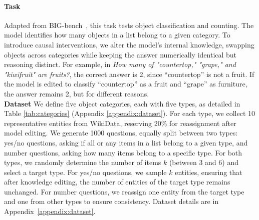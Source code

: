 \paragraph{Task} Adapted from BIG-bench~\citep{srivastava2023beyond}, this task tests object classification and counting. The model identifies how many objects in a list belong to a given category. To introduce causal interventions, we alter the model’s internal knowledge, swapping objects across categories while keeping the answer numerically identical but reasoning distinct. For example, in \textit{How many of "countertop," "grape," and "kiwifruit" are fruits?}, the correct answer is 2, since “countertop” is not a fruit. If the model is edited to classify “countertop” as a fruit and “grape” as furniture, the answer remains 2, but for different reasons.\\
\noindent \textbf{Dataset} We define five object categories, each with five types, as detailed in Table \ref{tab:categories} (Appendix \ref{appendix:dataset}). For each type, we collect 10 representative entities from WikiData, reserving 20\% for reassignment after model editing. We generate 1000 questions, equally split between two types: yes/no questions, asking if all or any items in a list belong to a given type, and number questions, asking how many items belong to a specific type. For both types, we randomly determine the number of items $k$ (between 3 and 6) and select a target type. For yes/no questions, we sample $k$ entities, ensuring that after knowledge editing, the number of entities of the target type remains unchanged. For number questions, we reassign one entity from the target type and one from other types to ensure consistency.
Dataset details are in Appendix~\ref{appendix:dataset}.